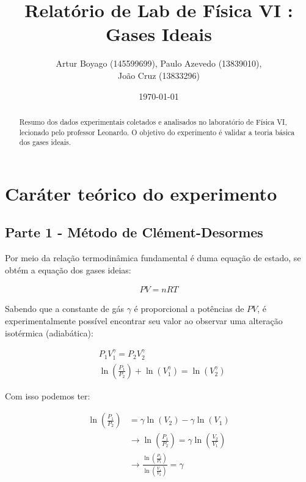 \documentclass[a4paper]{ltxdoc}
\numberwithin{equation}{section}
\begin{document}
\newcommand{\titulo}{\textbf{Relatório de Lab de Física VI : Gases Ideais}}
\newcommand{\abnTeX}{abn\TeX}

\title{\titulo}
\author{
Artur Boyago (145599699),
Paulo Azevedo (13839010), \\
João Cruz (13833296)
}
\date{\today}

\maketitle

\begin{abstract}
Resumo dos dados experimentais coletados e analisados no
laboratório de Física VI, lecionado pelo professor Leonardo. O objetivo do experimento
é validar a teoria básica dos gases ideais.
\end{abstract}

\tableofcontents

\section{Caráter teórico do experimento}

\subsection{Parte 1 - Método de Clément-Desormes}

Por meio da relação termodinâmica fundamental é duma equação de estado, se obtém a
equação dos gases ideias:

\begin{align}
    PV=nRT
\end{align}

Sabendo que a constante de gás $\gamma$ é proporcional a potências de $PV$, é experimentalmente possível
encontrar seu valor ao observar uma alteração isotérmica (adiabática):

\begin{align}
    &P_1V_1^\gamma = P_2V_2^\gamma \\
    &\ln \left ( \frac{P_1}{P_2} \right ) +\ln(V_1^\gamma) = \ln(V_2^\gamma)
\end{align}

Com isso podemos ter:

\begin{align}
    \ln \left ( \frac{P_1}{P_2} \right ) &=\gamma \ln(V_2)-\gamma \ln(V_1) \\
    &\rightarrow \ln \left ( \frac{P_1}{P_2} \right ) = \gamma \ln \left ( \frac{V_2}{V_1} \right ) \\
    &\rightarrow \frac {\ln \left ( \frac{P_2}{P_1} \right )}{\ln \left ( \frac{V_1}{V_2} \right ) } = \gamma
\end{align}
\end{document}
